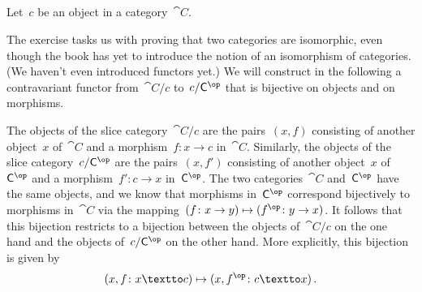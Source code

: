\subsection{}

Let~$c$ be an object in a category~$\cat{C}$.

The exercise tasks us with proving that two categories are isomorphic, even though the book has yet to introduce the notion of an isomorphism of categories.
(We haven’t even introduced functors yet.)
We will construct in the following a contravariant functor from~$\cat{C} / c$ to~$c / \cat{C}^{\op}$ that is bijective on objects and on morphisms.

The objects of the slice category~$\cat{C} / c$ are the pairs~$(x, f)$ consisting of another object~$x$ of~$\cat{C}$ and a morphism~$f \colon x \to c$ in~$\cat{C}$.
Similarly, the objects of the slice category~$c / \cat{C}^{\op}$ are the pairs~$(x, f')$ consisting of another object~$x$ of~$\cat{C}^{\op}$ and a morphism~$f' \colon c \to x$ in~$\cat{C}^{\op}$.
The two categories~$\cat{C}$ and~$\cat{C}^{\op}$ have the same objects, and we know that morphisms in~$\cat{C}^{\op}$ correspond bijectively to morphisms in~$\cat{C}$ via the mapping~$(f \colon x \to y) \mapsto (f^{\op} \colon y \to x)$.
It follows that this bijection restricts to a bijection between the objects of~$\cat{C} / c$ on the one hand and the objects of~$c / \cat{C}^{\op}$ on the other hand.
More explicitly, this bijection is given by
\[
	(x, f \colon x \textto c)
	\mapsto
	(x, f^{\op} \colon c \textto x) \,.
\]

